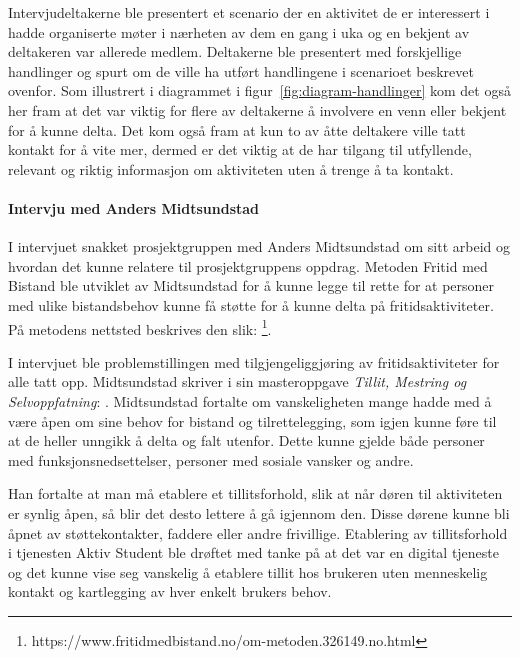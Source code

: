 Intervjudeltakerne ble presentert et scenario der en aktivitet de er interessert i hadde organiserte møter i nærheten av dem en gang i uka og en bekjent av deltakeren var allerede medlem. Deltakerne ble presentert med forskjellige handlinger og spurt om de ville ha utført handlingene i scenarioet beskrevet ovenfor. Som illustrert i diagrammet i figur~\ref{fig:diagram-handlinger} kom det også her fram at det var viktig for flere av deltakerne å involvere en venn eller bekjent for å kunne delta. Det kom også fram at kun to av åtte deltakere ville tatt kontakt for å vite mer, dermed er det viktig at de har tilgang til utfyllende, relevant og riktig informasjon om aktiviteten uten å trenge å ta kontakt.

\paragraph{Intervju med Anders Midtsundstad}
I intervjuet snakket prosjektgruppen med Anders Midtsundstad om sitt arbeid og hvordan det kunne relatere til prosjektgruppens oppdrag. Metoden Fritid med Bistand ble utviklet av Midtsundstad for å kunne legge til rette for at personer med ulike bistandsbehov kunne få støtte for å kunne delta på fritidsaktiviteter. På metodens nettsted beskrives den slik:  \footnote{https://www.fritidmedbistand.no/om-metoden.326149.no.html}. 

I intervjuet ble problemstillingen med tilgjengeliggjøring av fritidsaktiviteter for alle tatt opp. Midtsundstad skriver i sin masteroppgave {\em  Tillit, Mestring og Selvoppfatning}:  \cite{TILLIT:13}. Midtsundstad fortalte om vanskeligheten mange hadde med å være åpen om sine behov for bistand og tilrettelegging, som igjen kunne føre til at de heller unngikk å delta og falt utenfor. Dette kunne gjelde både personer med funksjonsnedsettelser, personer med sosiale vansker og andre. 

Han fortalte at man må etablere et tillitsforhold, slik at når døren til aktiviteten er synlig åpen, så blir det desto lettere å gå igjennom den. Disse dørene kunne bli åpnet av støttekontakter, faddere eller andre frivillige. Etablering av tillitsforhold i tjenesten Aktiv Student ble drøftet med tanke på at det var en digital tjeneste og det kunne vise seg vanskelig å etablere tillit hos brukeren uten menneskelig kontakt og kartlegging av hver enkelt brukers behov.

